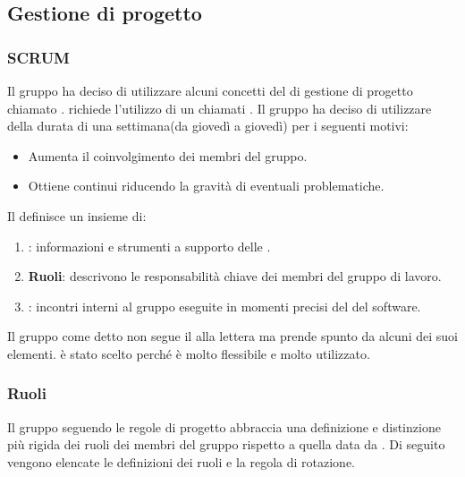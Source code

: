 \subsection{Gestione di progetto}
\label{subsec:gestione_progetto}

\subsubsection{SCRUM}
Il gruppo ha deciso di utilizzare alcuni concetti del  di gestione di progetto  chiamato .
 richiede l'utilizzo di un  chiamati \textbf{}.
Il gruppo ha deciso di utilizzare  della durata di una settimana(da giovedì a giovedì) per i seguenti motivi:
\begin{itemize}
    \item Aumenta il coinvolgimento dei membri del gruppo.
    \item Ottiene  continui riducendo la gravità di eventuali problematiche.
\end{itemize}
Il  definisce un insieme di:
\begin{enumerate}
    \item \textbf{}: informazioni e strumenti a supporto delle .
   
    \item \textbf{Ruoli}: descrivono le responsabilità chiave dei membri del gruppo di lavoro.
    
    \item \textbf{}: incontri interni al gruppo eseguite in momenti precisi del  del software.
\end{enumerate}
Il gruppo come detto non segue il  alla lettera ma prende spunto da alcuni dei suoi elementi.
 è stato scelto perché è molto flessibile e molto utilizzato. 

\subsubsection{Ruoli}
\label{subsubsec:ruoli}
Il gruppo seguendo le regole di progetto abbraccia una definizione e distinzione più rigida dei ruoli dei membri del gruppo rispetto a quella data da .  
Di seguito vengono elencate le definizioni dei ruoli e la regola di rotazione.

